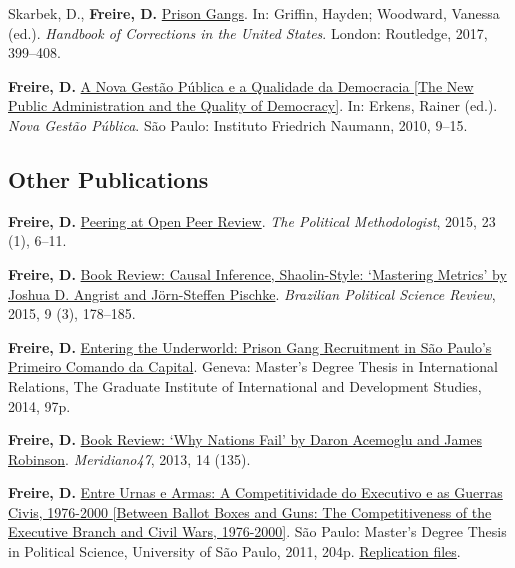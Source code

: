 \documentclass[a4paper]{article}
\renewenvironment{itemize}{
	\begin{list}{}{
			\setlength{\leftmargin}{1.5em}
		}
		}{
	\end{list}
}
\begin{document}
	\begin{itemize}
		\item Skarbek, D., \textbf{Freire, D.} \href{https://osf.io/kuqqx/}{Prison Gangs}. In: Griffin, Hayden; Woodward, Vanessa (ed.). \textit{Handbook of Corrections in the United States}. London: Routledge, 2017, 399--408.
		\item \textbf{Freire, D.} \href{https://fnst.org/sites/default/files/uploads/2017/12/08/ngp.pdf}{A Nova Gest\~{a}o P\'{u}blica e a Qualidade da Democracia {[}The New Public Administration and the Quality of Democracy{]}}. In: Erkens, Rainer (ed.). \textit{Nova Gest\~{a}o P\'{u}blica}. S\~{a}o Paulo: Instituto Friedrich Naumann, 2010, 9--15.
	\end{itemize}

	\subsection*{Other Publications}

	\begin{itemize}
		\item \textbf{Freire, D.} \href{https://thepoliticalmethodologist.files.wordpress.com/2016/02/tpm_v23_n1.pdf}{Peering at Open Peer Review}. \textit{The Political Methodologist}, 2015, 23 (1), 6--11.
		\item \textbf{Freire, D.} \href{http://www.scielo.br/readcube/epdf.php?doi=10.1590/1981-38212015000300026&pid=S1981-38212015000300178&pdf_path=bpsr/v9n3/1981-3821-bpsr-9-3-0178.pdf&lang=en}{Book Review: Causal Inference, Shaolin-Style: `Mastering Metrics' by Joshua D. Angrist and J\"{o}rn-Steffen Pischke}. \textit{Brazilian Political Science Review}, 2015, 9 (3), 178--185.
		\item \textbf{Freire, D.} \href{http://dx.doi.org/10.6084/m9.figshare.1209203}{Entering the Underworld: Prison Gang Recruitment in S\~{a}o Paulo's Primeiro Comando da Capital}. Geneva: Master's Degree Thesis in International Relations, The Graduate Institute of International and Development Studies, 2014, 97p.
		\item \textbf{Freire, D.} \href{http://seer.bce.unb.br/index.php/MED/article/view/7505/6497}{Book Review: `Why Nations Fail' by Daron Acemoglu and James Robinson}. \textit{Meridiano47}, 2013, 14 (135).
		\item \textbf{Freire, D.} \href{http://dx.doi.org/10.6084/m9.figshare.963082}{Entre Urnas e Armas: A Competitividade do Executivo e as Guerras Civis, 1976-2000 {[}Between Ballot Boxes and Guns: The Competitiveness of the Executive Branch and Civil Wars, 1976-2000{]}}. S\~{a}o Paulo: Master's Degree Thesis in Political Science, University of S\~{a}o Paulo, 2011, 204p. \href{http://dx.doi.org/10.6084/m9.figshare.963183}{Replication files}.
	\end{itemize}
\end{document}
